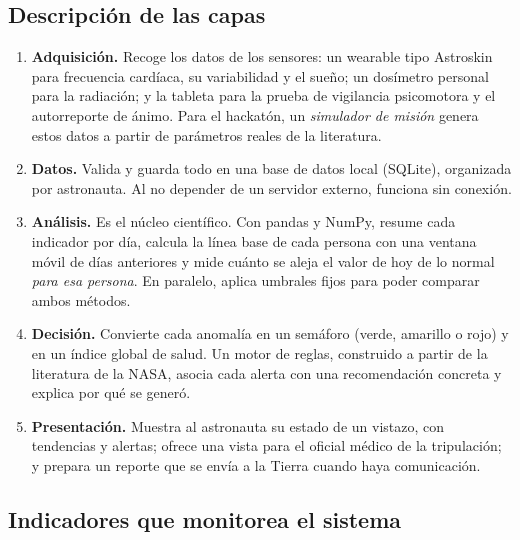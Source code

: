 \documentclass[11pt,a4paper]{article}
\begin{document}
\subsection{Descripción de las capas}

\begin{enumerate}
  \item \textbf{Adquisición.} Recoge los datos de los sensores: un wearable tipo Astroskin para frecuencia cardíaca, su variabilidad y el sueño; un dosímetro personal para la radiación; y la tableta para la prueba de vigilancia psicomotora y el autorreporte de ánimo. Para el hackatón, un \emph{simulador de misión} genera estos datos a partir de parámetros reales de la literatura.
  \item \textbf{Datos.} Valida y guarda todo en una base de datos local (SQLite), organizada por astronauta. Al no depender de un servidor externo, funciona sin conexión.
  \item \textbf{Análisis.} Es el núcleo científico. Con pandas y NumPy, resume cada indicador por día, calcula la línea base de cada persona con una ventana móvil de días anteriores y mide cuánto se aleja el valor de hoy de lo normal \emph{para esa persona}. En paralelo, aplica umbrales fijos para poder comparar ambos métodos.
  \item \textbf{Decisión.} Convierte cada anomalía en un semáforo (verde, amarillo o rojo) y en un índice global de salud. Un motor de reglas, construido a partir de la literatura de la NASA, asocia cada alerta con una recomendación concreta y explica por qué se generó.
  \item \textbf{Presentación.} Muestra al astronauta su estado de un vistazo, con tendencias y alertas; ofrece una vista para el oficial médico de la tripulación; y prepara un reporte que se envía a la Tierra cuando haya comunicación.
\end{enumerate}

\subsection{Indicadores que monitorea el sistema}
\end{document}
